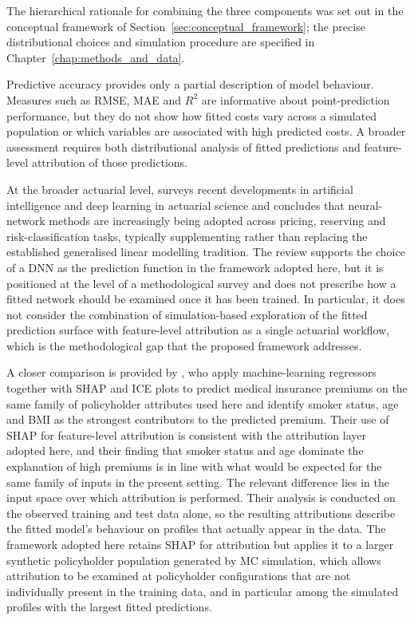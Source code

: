 \noindent
The hierarchical rationale for combining the three components was set out
in the conceptual framework of Section~\ref{sec:conceptual_framework}; the
precise distributional choices and simulation procedure are specified in
Chapter~\ref{chap:methods_and_data}.

\noindent
Predictive accuracy provides only a partial description of model behaviour.
Measures such as RMSE, MAE and \ensuremath{R^2} are informative about
point-prediction performance, but they do not show how fitted costs vary
across a simulated population or which variables are associated with high
predicted costs. A broader assessment requires both distributional analysis of
fitted predictions and feature-level attribution of those predictions.

\noindent
At the broader actuarial level, \citet{richman2021ai} surveys recent
developments in artificial intelligence and deep learning in actuarial
science and concludes that neural-network methods are increasingly being
adopted across pricing, reserving and risk-classification tasks, typically
supplementing rather than replacing the established generalised linear
modelling tradition. The review supports the choice of a DNN
as the prediction function in the framework adopted here, but it is positioned
at the level of a methodological survey and does not prescribe how a fitted
network should be examined once it has been trained. In particular, it does
not consider the combination of simulation-based exploration of the fitted
prediction surface with feature-level attribution as a single actuarial
workflow, which is the methodological gap that the proposed framework
addresses.

\noindent
A closer comparison is provided by \citet{orji2024explainable}, who apply
machine-learning regressors together with SHAP and ICE plots to
predict medical insurance premiums on the same family of policyholder
attributes used here and identify smoker status, age and BMI as the
strongest contributors to the predicted premium. Their use of SHAP for
feature-level attribution is consistent with the attribution layer adopted
here, and their finding that smoker status and age dominate the explanation of
high premiums is in line with what would be expected for the same family of
inputs in the present setting. The relevant difference lies in the input space
over which attribution is performed. Their analysis is conducted on the
observed training and test data alone, so the resulting attributions describe
the fitted model's behaviour on profiles that actually appear in the data. The
framework adopted here retains SHAP for attribution but applies it to a
larger synthetic policyholder population generated by MC simulation,
which allows attribution to be examined at policyholder configurations that
are not individually present in the training data, and in particular among
the simulated profiles with the largest fitted predictions.


